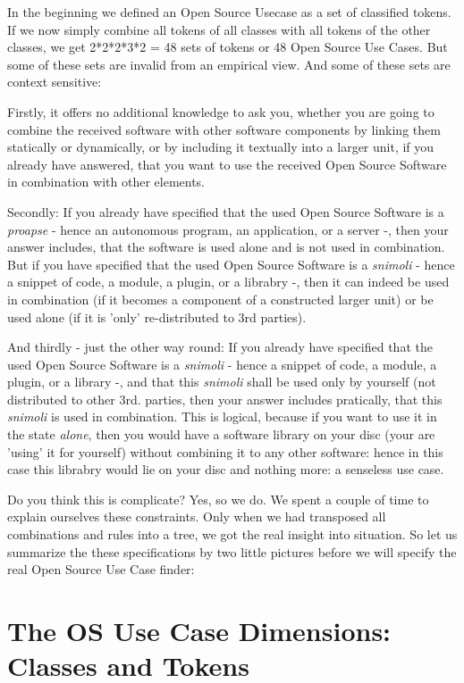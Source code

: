 In the beginning we defined an Open Source Usecase as a set of classified
tokens. If we now simply combine all tokens of all classes with all tokens of
the other classes, we get 2*2*2*3*2 = 48 sets of tokens or 48 Open Source Use
Cases. But some of these sets are invalid from an empirical view. And some of
these sets are context sensitive:

Firstly, it offers no additional knowledge to ask you, whether you are going to
combine the received software with other software components by linking them
statically or dynamically, or by including it textually into a larger unit, if
you already have answered, that you want to use the received Open Source
Software in combination with other elements.

Secondly: If you already have specified that the used Open Source
Software is a \textit{proapse} - hence an autonomous program, an application,
or a server -, then your answer includes, that the software is used alone and is
not used in combination. But if you have specified that the used Open Source
Software is a \textit{snimoli} - hence a snippet of code, a module, a plugin, or a
librabry -, then it can indeed be used in combination (if it becomes a
component of a constructed larger unit) or be used alone (if it is
'only' re-distributed to 3rd parties).

And thirdly - just the other way round: If you already have specified that the
used Open Source Software is a \textit{snimoli} - hence a snippet of code, a
module, a plugin, or a library -, and that this \textit{snimoli} shall be used
only by yourself (not distributed to other 3rd. parties, then your answer
includes pratically, that this \textit{snimoli} is used in combination. This
is logical, because if you want to use it in the state \textit{alone}, then you
would have a software library on your disc (your are 'using' it for yourself)
without combining it to any other software: hence in this case this librabry
would lie on your disc and nothing more: a senseless use case.

Do you think this is complicate? Yes, so we do. We spent a couple of time to
explain ourselves these constraints. Only when we had transposed all
combinations and rules into a tree, we got the real insight into situation.
So let us summarize the these specifications by two little pictures before we
will specify the real Open Source Use Case finder:

\section{The OS Use Case Dimensions: Classes and Tokens}

